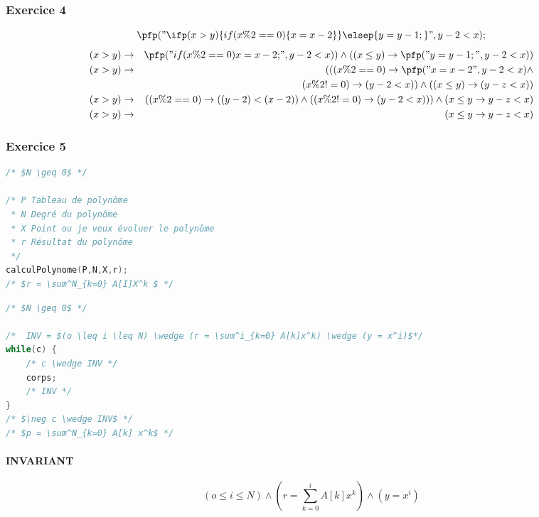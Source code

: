 \subsubsection{Exercice 4}
$$\pfp ("\ifp (x > y) \{ if(x \%2 ==  0) \{ x = x - 2\}\} \elsep \{y=y-1;\}", y-2 < x);$$
\begin{eqnarray*}
	(x > y) &\rightarrow& \pfp("if(x\%2 == 0) { x = x-2; } ", y-2 < x)) \wedge ( ( x \leq y) \rightarrow \pfp ("y = y-1;", y - 2 < x) )\\
	(x > y) &\rightarrow& ( ( (x \%2 = =0) \rightarrow \pfp ("x = x-2", y-2 < x) \wedge \\
	& &(x \% 2 != 0) \rightarrow(y-2 < x)) \wedge ( (x \leq y) \rightarrow (y-z < x))\\ 
	(x > y) &\rightarrow& ( (x\%2 = = 0)\rightarrow ( (y-2) < (x - 2) ) \wedge ( ( x\%2 != 0) \rightarrow (y-2 < x))) \wedge (x \leq y \rightarrow y-z < x) \\
	(x > y) &\rightarrow& (x \leq y \rightarrow y - z < x)
\end{eqnarray*}

\subsubsection{Exercice 5}
\begin{lstlisting}[language=C]
/* $N \geq 0$ */

/* P Tableau de polynôme
 * N Degré du polynôme
 * X Point ou je veux évoluer le polynôme
 * r Résultat du polynôme
 */
calculPolynome(P,N,X,r);
/* $r = \sum^N_{k=0} A[I]X^k $ */
\end{lstlisting}
\begin{lstlisting}[language=C]
/* $N \geq 0$ */

/*	INV = $(o \leq i \leq N) \wedge (r = \sum^i_{k=0} A[k]x^k) \wedge (y = x^i)$*/
while(c) {
	/* c \wedge INV */
	corps;
	/* INV */
}
/* $\neg c \wedge INV$ */
/* $p = \sum^N_{k=0} A[k] x^k$ */
\end{lstlisting}
\paragraph{INVARIANT}
	$$(o \leq i \leq N) \wedge (r = \sum^i_{k=0} A[k]x^k) \wedge (y = x^i)$$
